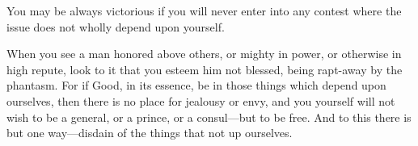 You may be always victorious if you will never enter into any contest where the
issue does not wholly depend upon yourself.

When you see  a man honored above  others, or mighty in power,  or otherwise in
high repute, look to it that you esteem him not blessed, being rapt-away by the
phantasm. For  if Good, in  its essence, be in  those things which  depend upon
ourselves, then there is  no place for jealousy or envy,  and you yourself will
not wish  to be a general,  or a prince, or  a consul---but to be  free. And to
this there is but one way---disdain of the things that not up ourselves.
